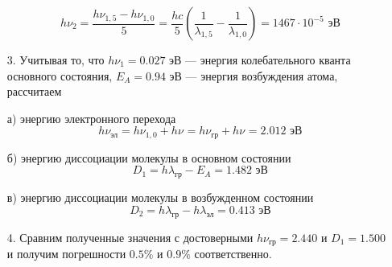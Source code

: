 \documentclass[12pt]{report}
\begin{document}
\begin{enumerate}
$$h\nu_2 = \frac{h\nu_{1,5} - h\nu_{1,0}}{5} = \frac{hc}{5} \left( \frac{1}{\lambda_{1,5}} - \frac{1}{\lambda_{1,0}} \right) = 1467 \cdot 10^{-5} \text{ эВ}$$

\item[3.] Учитывая то, что $h\nu_1 = 0.027$ эВ --- энергия колебательного кванта основного состояния, $E_A = 0.94$ эВ --- энергия возбуждения атома, рассчитаем

а) энергию электронного перехода
$$h\nu_\text{эл} = h\nu_{1,0} + h\nu_{} = h\nu_\text{гр} + h\nu_{} = 2.012 \text{ эВ}$$

б) энергию диссоциации молекулы в основном состоянии
$$D_1 = h\lambda_\text{гр} - E_A = 1.482 \text{ эВ}$$

в) энергию диссоциации молекулы в возбужденном состоянии
$$D_2 = h\lambda_\text{гр} - h\lambda_\text{эл} = 0.413 \text{ эВ}$$

\item[4.] Сравним полученные значения с достоверными $h\nu_\text{гр} = 2.440$ и $D_1 = 1.500$ и получим погрешности $0.5\%$ и $0.9\%$ соответственно.


\end{enumerate}
\end{document}

